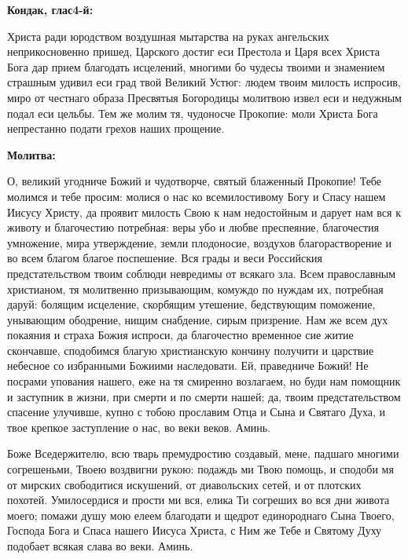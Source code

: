 \medskip


\bfseries Кондак, глас4-й:\normalfont{}


Христа ради юродством воздушная мытарства на руках ангельских неприкосновенно пришед, Царского достиг еси Престола и Царя всех Христа Бога дар прием благодать исцелений, многими бо чудесы твоими и знамением страшным удивил еси град твой Великий Устюг: людем твоим милость испросив, миро от честнаго образа Пресвятыя Богородицы молитвою извел еси и недужным подал еси цельбы. Тем же молим тя, чудоносче Прокопие: моли Христа Бога непрестанно подати грехов наших прощение.


\medskip


\bfseries Молитва:\normalfont{}


О, великий угодниче Божий и чудотворче, святый блаженный Прокопие! Тебе молимся и тебе просим: молися о нас ко всемилостивому Богу и Спасу нашем Иисусу Христу, да проявит милость Свою к нам недостойным и дарует нам вся к животу и благочестию потребная: веры убо и любве преспеяние, благочестия умножение, мира утверждение, земли плодоносие, воздухов благорастворение и во всем благом благое поспешение. Вся грады и веси Российския предстательством твоим соблюди невредимы от всякаго зла. Всем православным христианом, тя молитвенно призывающим, комуждо по нуждам их, потребная даруй: болящим исцеление, скорбящим утешение, бедствующим поможение, унывающим ободрение, нищим снабдение, сирым призрение.  Нам же всем дух покаяния и страха Божия испроси, да благочестно временное сие житие скончавше, сподобимся благую христианскую кончину получити и царствие небесное со избранными Божиими наследовати. Ей, праведниче Божий! Не посрами упования нашего, еже на тя смиренно возлагаем, но буди нам помощник и заступник в жизни, при смерти и по смерти нашей; да, твоим предстательством спасение улучивше, купно с тобою прославим Отца и Сына и Святаго Духа, и твое крепкое заступление о нас, во веки веков. Аминь.


\mychapterending

 


Боже Вседержителю, всю тварь премудростию создавый, мене, падшаго многими согрешеньми, Твоею воздвигни рукою: подаждь ми Твою помощь, и сподоби мя от мирских свободитися искушений, от диавольских сетей, и от плотских похотей. Умилосердися и прости ми вся, елика Ти согреших во вся дни живота моего; помажи душу мою елеем благодати и щедрот единороднаго Сына Твоего, Господа Бога и Спаса нашего Иисуса Христа, с Ним же Тебе и Святому Духу подобает всякая слава во веки. Аминь.


